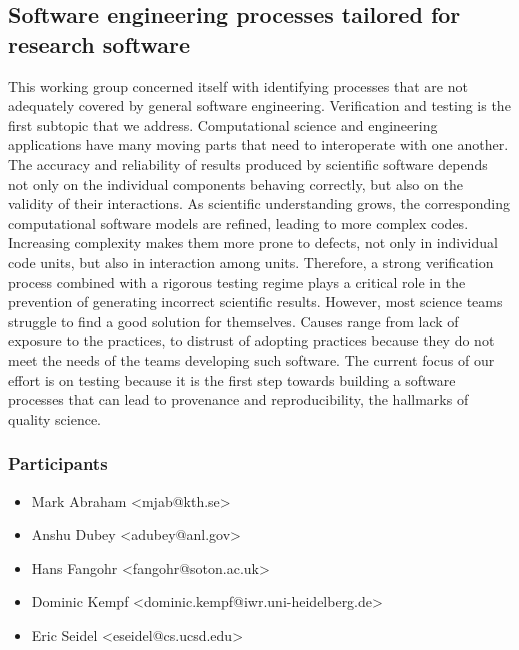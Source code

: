 \subsection{Software engineering processes tailored for research software}
\label{sec:soft-eng}


This working group concerned itself with identifying processes that are not adequately
covered by general software engineering. Verification and testing is
the first subtopic that we address.
Computational science and engineering applications have many moving
parts that need to interoperate with one another. The accuracy and
reliability of results produced by scientific software depends not
only on the individual components behaving correctly, but also on the
validity of their interactions.
As scientific understanding grows,
the corresponding computational software models are refined, leading
to more complex codes. Increasing complexity makes them more prone to
defects, not only in individual code units, but also in interaction
among units. Therefore, a strong verification process combined with a
rigorous testing regime plays a critical role in the prevention of
generating incorrect scientific results. However, most science teams
struggle to find a good solution for themselves. Causes range from
lack of exposure to the practices, to distrust of adopting practices
because they do not meet the needs of the teams developing such
software.  The current focus of our effort is on testing because it is the first step
towards building a software processes that can lead to provenance and
reproducibility, the hallmarks of quality science.

\subsubsection{Participants}
\begin{itemize}
\item Mark Abraham <mjab@kth.se>
\item Anshu Dubey <adubey@anl.gov>
\item Hans Fangohr <fangohr@soton.ac.uk>
\item Dominic Kempf <dominic.kempf@iwr.uni-heidelberg.de>
\item Eric Seidel <eseidel@cs.ucsd.edu>
\end{itemize}

